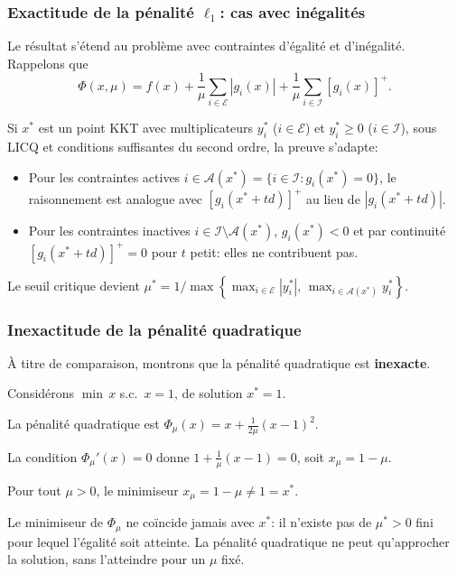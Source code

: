 \documentclass[t,usepdftitle=false,aspectratio=169]{beamer}
\def\cA{\mathcal{A}}
\def\cE{\mathcal{E}}
\def\cI{\mathcal{I}}
\begin{document}
\begin{frame}
\frametitle{Exactitude de la pénalité $\ell_1$: cas avec inégalités}

Le résultat s'étend au problème avec contraintes d'égalité et d'inégalité. Rappelons que
$$
\Phi(x, \mu) = f(x) + \frac{1}{\mu} \sum_{i \in \cE} | g_i(x) | + \frac{1}{\mu} \sum_{i \in \cI} [ g_i(x) ]^+.
$$

\mbox{}

Si $x^*$ est un point KKT avec multiplicateurs $y_i^*$ ($i \in \cE$) et $y_i^* \geq 0$ ($i \in \cI$), sous LICQ et conditions suffisantes du second ordre, la preuve s'adapte:

\begin{itemize}
\item 
Pour les contraintes actives $i \in \cA(x^*) = \{i \in \cI : g_i(x^*) = 0\}$, le raisonnement est analogue avec $[g_i(x^*+td)]^+$ au lieu de $|g_i(x^*+td)|$.
\item
Pour les contraintes inactives $i \in \cI \setminus \cA(x^*)$, $g_i(x^*) < 0$ et par continuité $[g_i(x^*+td)]^+ = 0$ pour $t$ petit: elles ne contribuent pas.
\end{itemize}

\mbox{}

Le seuil critique devient $\mu^* = 1/\max\left\{ \max_{i \in \cE}|y_i^*|,\, \max_{i \in \cA(x^*)} y_i^* \right\}$.

\end{frame}

\begin{frame}
\frametitle{Inexactitude de la pénalité quadratique}

À titre de comparaison, montrons que la pénalité quadratique est \textbf{inexacte}.

\mbox{}

Considérons $\min\, x$ s.c.\ $x = 1$, de solution $x^* = 1$.

\mbox{}

La pénalité quadratique est $\Phi_\mu(x) = x + \frac{1}{2\mu}(x-1)^2$.

\mbox{}

La condition $\Phi_\mu'(x) = 0$ donne $1 + \frac{1}{\mu}(x-1) = 0$, soit $x_\mu = 1-\mu$.

\mbox{}

Pour tout $\mu > 0$, le minimiseur $x_\mu = 1 - \mu \neq 1 = x^*$.

\mbox{}

Le minimiseur de $\Phi_\mu$ ne coïncide jamais avec $x^*$: il n'existe pas de $\mu^* > 0$ fini pour lequel l'égalité soit atteinte. La pénalité quadratique ne peut qu'approcher la solution, sans l'atteindre pour un $\mu$ fixé.

\end{frame}
\end{document}
